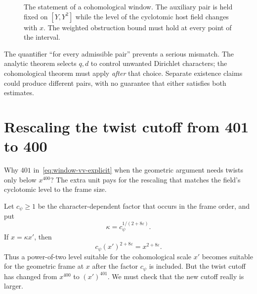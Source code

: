 \documentclass[11pt,openany,oneside]{scrbook}
\theoremstyle{definition}
\theoremstyle{remark}
\newcommand{\eps}{\varepsilon}
\begin{document}
\begin{figure}[ht]
\centering
{}
\caption{The statement of a cohomological window. The auxiliary pair is held fixed on $[Y,Y^2]$ while the level of the cyclotomic host field changes with $x$. The weighted obstruction bound must hold at every point of the interval.}
\label{fig:coho-window}
\end{figure}

The quantifier ``for every admissible pair'' prevents a serious mismatch. The analytic theorem selects $q,d$ to control unwanted Dirichlet characters; the cohomological theorem must apply \emph{after} that choice. Separate existence claims could produce different pairs, with no guarantee that either satisfies both estimates.

\section{Rescaling the twist cutoff from 401 to 400}\label{sec:400-401}

Why $401$ in~\eqref{eq:window-vv-explicit} when the geometric argument needs twists only below $x^{400}$? The extra unit pays for the rescaling that matches the field's cyclotomic level to the frame size.

Let $c_\psi\ge1$ be the character-dependent factor that occurs in the frame order, and put
\[
\kappa=c_\psi^{1/(2+8\eps)}.
\]
If $x=\kappa x'$, then
\[
c_\psi(x')^{2+8\eps}=x^{2+8\eps}.
\]
Thus a power-of-two level suitable for the cohomological scale $x'$ becomes suitable for the geometric frame at $x$ after the factor $c_\psi$ is included.  But the twist cutoff has changed from $x^{400}$ to $(x')^{401}$.  We must check that the new cutoff really is larger.
\end{document}
